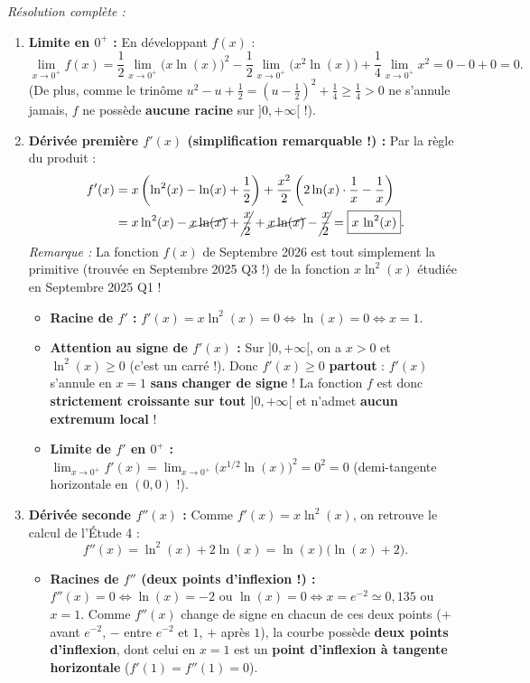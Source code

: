 \begin{exemple}
\emph{Résolution complète :}
\begin{enumerate}[label=\alph*)]
    \item \textbf{Limite en $0^+$ :} En développant $f(x)$ :
    \[
        \lim_{x \to 0^+} f(x) = \frac{1}{2}\lim_{x \to 0^+} \bigl(x\ln(x)\bigr)^2 - \frac{1}{2}\lim_{x \to 0^+} \bigl(x^2\ln(x)\bigr) + \frac{1}{4}\lim_{x \to 0^+} x^2 = 0 - 0 + 0 = \boxed{0}.
    \]
    (De plus, comme le trinôme $u^2 - u + \frac{1}{2} = \left(u - \frac{1}{2}\right)^2 + \frac{1}{4} \ge \frac{1}{4} > 0$ ne s'annule jamais, $f$ ne possède \textbf{aucune racine} sur $]0, +\infty[$ !).
    \item \textbf{Dérivée première $f'(x)$ (simplification remarquable !) :} Par la règle du produit :
    \begin{align*}
        f'(x) &= x\left(\ln^2(x) - \ln(x) + \frac{1}{2}\right) + \frac{x^2}{2}\left(2\ln(x)\cdot\frac{1}{x} - \frac{1}{x}\right) \\
        &= x\ln^2(x) - \cancel{x\ln(x)} + \cancel{\frac{x}{2}} + \cancel{x\ln(x)} - \cancel{\frac{x}{2}} = \boxed{x\,\ln^2(x)}.
    \end{align*}
    \emph{Remarque :} La fonction $f(x)$ de Septembre 2026 est tout simplement la primitive (trouvée en Septembre 2025 Q3 !) de la fonction $x\ln^2(x)$ étudiée en Septembre 2025 Q1 !
    \begin{itemize}
        \item \textbf{Racine de $f'$ :} $f'(x) = x\ln^2(x) = 0 \iff \ln(x) = 0 \iff \boxed{x = 1}$.
        \item \textbf{Attention au signe de $f'(x)$ :} Sur $]0, +\infty[$, on a $x > 0$ et $\ln^2(x) \ge 0$ (c'est un carré !). Donc $f'(x) \ge 0$ \textbf{partout} : $f'(x)$ s'annule en $x = 1$ \textbf{sans changer de signe} ! La fonction $f$ est donc \textbf{strictement croissante sur tout $]0, +\infty[$} et n'admet \textbf{aucun extremum local} !
        \item \textbf{Limite de $f'$ en $0^+$ :} $\lim_{x \to 0^+} f'(x) = \lim_{x \to 0^+} \bigl(x^{1/2}\ln(x)\bigr)^2 = 0^2 = \boxed{0}$ (demi-tangente horizontale en $(0,0)$ !).
    \end{itemize}
    \item \textbf{Dérivée seconde $f''(x)$ :} Comme $f'(x) = x\ln^2(x)$, on retrouve le calcul de l'Étude 4 :
    \[
        \boxed{f''(x) = \ln^2(x) + 2\ln(x) = \ln(x)\bigl(\ln(x) + 2\bigr)}.
    \]
    \begin{itemize}
        \item \textbf{Racines de $f''$ (deux points d'inflexion !) :} $f''(x) = 0 \iff \ln(x) = -2$ ou $\ln(x) = 0 \iff \boxed{x = e^{-2} \simeq 0,135}$ ou $\boxed{x = 1}$. Comme $f''(x)$ change de signe en chacun de ces deux points ($+$ avant $e^{-2}$, $-$ entre $e^{-2}$ et $1$, $+$ après $1$), la courbe possède \textbf{deux points d'inflexion}, dont celui en $x = 1$ est un \textbf{point d'inflexion à tangente horizontale} ($f'(1) = f''(1) = 0$).

\end{itemize}
\end{enumerate}
\end{exemple}
